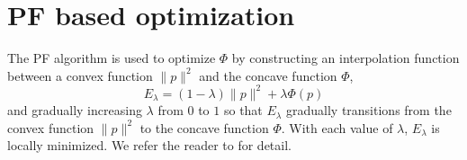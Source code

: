\documentclass[11pt,bezier,]{article}
\begin{document}
\section{PF based optimization\label{sec:optimize}}
The PF algorithm \cite{GM_PF_quadratic} is used to optimize $\Phi$
 by constructing an interpolation function 
between a convex  function $\|p\|^2$ and the concave function $\Phi$,
\[
 E_\lambda=(1-\lambda)\|p\|^2 +\lambda \Phi(p)
\]
and gradually increasing $\lambda$ from $0$ to $1$ so that
$E_\lambda$ gradually transitions from the convex function $\|p\|^2$ to the concave function $\Phi$.
With each value of $\lambda$, $E_\lambda$ is locally minimized.
We refer the reader to \cite{RPM_PF_aff} for detail.
\end{document}
